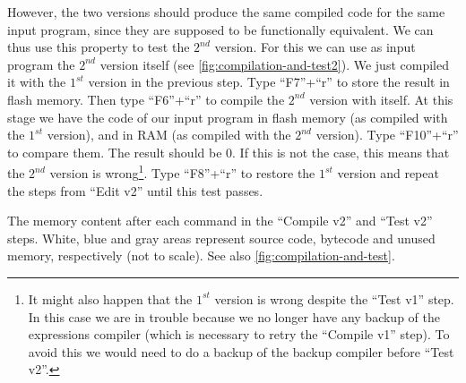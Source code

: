 However, the two versions should produce the same compiled code for the same
input program, since they are supposed to be functionally equivalent. We can
thus use this property to test the $2^{nd}$ version. For this we can use as
input program the $2^{nd}$ version itself (see
\cref{fig:compilation-and-test2}). We just compiled it with the $1^{st}$
version in the previous step. Type ``F7''+``r'' to store the result in flash
memory. Then type ``F6''+``r'' to compile the $2^{nd}$ version with itself. At
this stage we have the code of our input program in flash memory (as compiled
with the $1^{st}$ version), and in RAM (as compiled with the $2^{nd}$ version).
Type ``F10''+``r'' to compare them. The result should be 0. If this is not the
case, this means that the $2^{nd}$ version is wrong\footnote{It might also
happen that the $1^{st}$ version is wrong despite the ``Test v1'' step. In this
case we are in trouble because we no longer have any backup of the expressions
compiler (which is necessary to retry the ``Compile v1'' step). To avoid this
we would need to do a backup of the backup compiler before ``Test v2''.}. Type
``F8''+``r'' to restore the $1^{st}$ version and repeat the steps from ``Edit
v2'' until this test passes.


\begin{Figure}
  

  \caption{The memory content after each command in the ``Compile v2'' and
  ``Test v2'' steps. White, blue and gray areas represent source code, bytecode
  and unused memory, respectively (not to scale). See also
  \cref{fig:compilation-and-test}.}\label{fig:compilation-and-test2}
\end{Figure}
